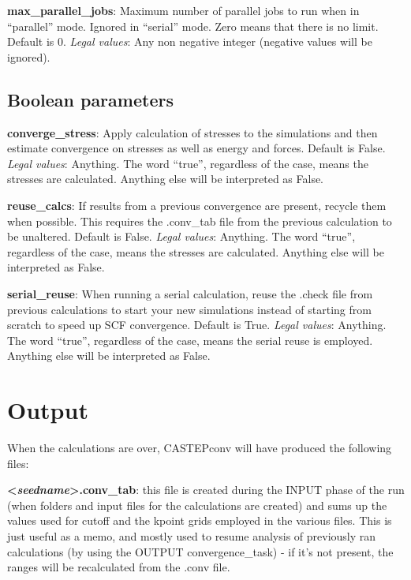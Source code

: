 \documentclass[10pt]{article}
\begin{document}
\textbf{max\_parallel\_jobs}: Maximum number of parallel jobs to run when in 
``parallel'' mode. Ignored in ``serial'' mode. Zero means that there is no 
limit. Default is 0.\newline
\textit{Legal values}: Any non negative integer (negative values will be 
ignored).\newline

\subsection{Boolean parameters}

\textbf{converge\_stress}: Apply calculation of stresses to the simulations and 
then estimate convergence on stresses as well as energy and forces. Default is 
False.\newline
\textit{Legal values}: Anything. The word ``true'', regardless of the case, 
means the stresses are calculated. Anything else will be interpreted as 
False.\newline

\textbf{reuse\_calcs}: If results from a previous convergence are present, 
recycle them when possible. This requires the .conv\_tab file from the previous 
calculation to be unaltered. Default is False.\newline
\textit{Legal values}: Anything. The word ``true'', regardless of the case, 
means the stresses are calculated. Anything else will be interpreted as 
False.\newline

\textbf{serial\_reuse}: When running a serial calculation, reuse the .check file from previous calculations to start your new simulations instead of starting from scratch to speed up SCF convergence. Default is True.\newline
\textit{Legal values}: Anything. The word ``true'', regardless of the case, 
means the serial reuse is employed. Anything else will be interpreted as 
False.\newline

\section{Output}

When the calculations are over, CASTEPconv will have produced the following 
files:

\textbf{\textless \textit{seedname}\textgreater.conv\_tab}: this file is created 
during the INPUT phase of the run (when folders and input files for the 
calculations are created) and sums up the values used for cutoff and the kpoint 
grids employed in the various files. This is just useful as a memo, and mostly 
used to resume analysis of previously ran calculations (by using the OUTPUT 
convergence\_task) - if it's not present, the ranges will be recalculated from 
the .conv file.
\end{document}
